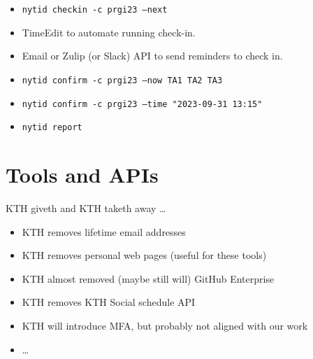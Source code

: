 \begin{frame}[fragile]
  \begin{example}[TA confirmation]
    \begin{itemize}
      \item \texttt{nytid checkin -c prgi23 --next }
      \item TimeEdit to automate running check-in.
      \item Email or Zulip (or Slack) API to send reminders to check in.
      \item \texttt{nytid confirm -c prgi23 --now TA1 TA2 TA3}
      \item \texttt{nytid confirm -c prgi23 --time "2023-09-31 13:15"}
    \end{itemize}
  \end{example}

  \pause

  \begin{example}
    \begin{itemize}
      \item \texttt{nytid report}
    \end{itemize}
  \end{example}
\end{frame}

\section{Tools and APIs}

\begin{frame}[fragile]
  \begin{center}
    \LARGE
    KTH giveth and KTH taketh away \dots
  \end{center}

  \begin{remark}
    \begin{itemize}
      \item KTH removes lifetime email addresses
      \item KTH removes personal web pages \alert<+>{(useful for these tools)}
      \item KTH almost removed (maybe still will) GitHub Enterprise
      \item KTH removes KTH Social schedule API
      \item \alert<+>{KTH will introduce MFA, but probably not aligned with our 
        work}
      \item \dots
    \end{itemize}
  \end{remark}
\end{frame}


